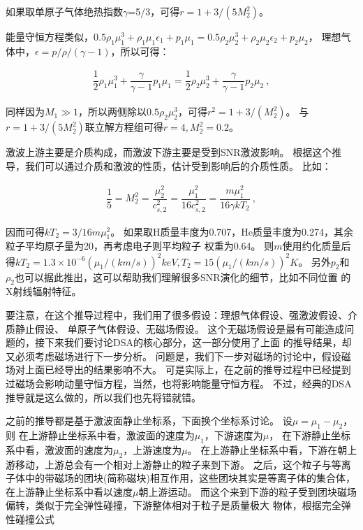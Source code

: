如果取单原子气体绝热指数$\gamma$=5/3，可得$r=1+3/(5 M_{2}^{2})$。

能量守恒方程类似，$0.5\rho_1\mu_1^3+\rho_1\mu_1\epsilon_1+p_1\mu_1=
0.5\rho_2\mu_2^3+\rho_2\mu_2\epsilon_2+p_2\mu_2$，
理想气体中，$\epsilon=p/\rho/(\gamma-1)$，所以可得：

\begin{equation}
    \begin{aligned}
      \dfrac{1}{2}\rho_1\mu_1^3+\dfrac{\gamma}{\gamma-1}p_1\mu_1=
      \dfrac{1}{2}\rho_2\mu_2^3+\dfrac{\gamma}{\gamma-1}p_2\mu_2\ ,
    \end{aligned}
\end{equation}

同样因为$M_1\gg 1$，所以两侧除以$0.5\rho_2\mu_2^3$，可得$r^2=1+3/(M_{2}^{2})$。
与$r=1+3/(5 M_{2}^{2})$联立解方程组可得$r=4, M_{2}^{2}=0.2$。

激波上游主要是介质构成，而激波下游主要是受到SNR激波影响。
根据这个推导，我们可以通过介质和激波的性质，估计受到影响后的介质性质。
比如：

\begin{equation}
    \begin{aligned}
      \dfrac{1}{5}=M_{2}^{2}=\dfrac{\mu_{2}^{2}}{c_{s, 2}^{2}}=
      \dfrac{\mu_{1}^{2}}{16 c_{s, 2}^{2}}=\dfrac{m \mu_{1}^{2}}{16 \gamma k T_{2}}\ ,
    \end{aligned}
\end{equation}

因而可得$k T_{2}=3/16 m \mu_{1}^{2}$。
如果取H质量丰度为0.707，He质量丰度为0.274，其余粒子平均原子量为20，再考虑电子则平均粒子
权重为0.64。
则$m$使用约化质量后得$k T_{2}=1.3 \times 10^{-6}(\mu_1/(km/s))^2 keV, T_2 =
15 (\mu_1/(km/s))^2 K$。
另外$p_2$和$\rho_2$也可以据此推出，这可以帮助我们理解很多SNR演化的细节，比如不同位置
的X射线辐射特征。

要注意，在这个推导过程中，我们用了很多假设：理想气体假设、强激波假设、介质静止假设、
单原子气体假设、无磁场假设。
这个无磁场假设是最有可能造成问题的，接下来我们要讨论DSA的核心部分，这一部分使用了上面
的推导结果，却又必须考虑磁场进行下一步分析。
问题是，我们下一步对磁场的讨论中，假设磁场对上面已经导出的结果影响不大。
可是实际上，在之前的推导过程中已经提到过磁场会影响动量守恒方程，当然，也将影响能量守恒方程。
不过，经典的DSA推导就是这么做的，所以我们也先将错就错。

之前的推导都是基于激波面静止坐标系，下面换个坐标系讨论。
设$\mu=\mu_1-\mu_2$，则
在上游静止坐标系中看，激波面的速度为$\mu_1$，下游速度为$\mu$，
在下游静止坐标系中看，激波面的速度为$\mu_2$，上游速度为$\mu$。
在上游静止坐标系中看，下游在朝上游移动，上游总会有一个相对上游静止的粒子来到下游。
之后，这个粒子与等离子体中的带磁场的团块(简称磁块)相互作用，这些团块其实是等离子体的集合体，
在上游静止坐标系中看以速度$\mu$朝上游运动。
而这个来到下游的粒子受到团块磁场偏转，类似于完全弹性碰撞，下游整体相对于粒子是质量极大
物体，根据完全弹性碰撞公式


